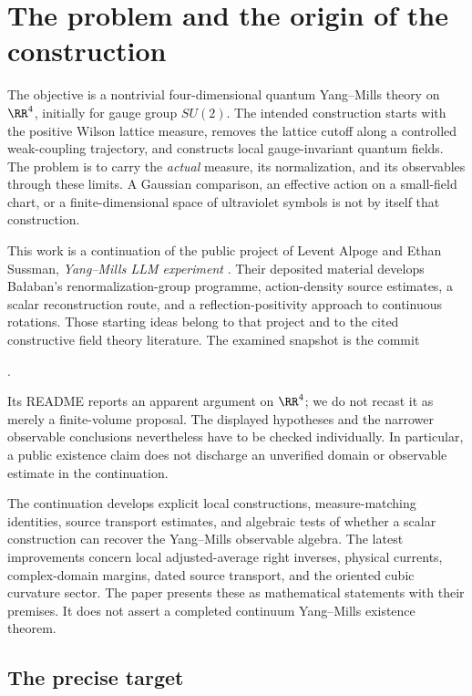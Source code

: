 \section{The problem and the origin of the construction}
\label{sec:introduction}

The objective is a nontrivial four-dimensional quantum Yang--Mills theory on
\(\RR^4\), initially for gauge group \(SU(2)\). The intended construction
starts with the positive Wilson lattice measure, removes the lattice cutoff
along a controlled weak-coupling trajectory, and constructs local
gauge-invariant quantum fields. The problem is to carry the \emph{actual}
measure, its normalization, and its observables through these limits. A
Gaussian comparison, an effective action on a small-field chart, or a
finite-dimensional space of ultraviolet symbols is not by itself that
construction.

This work is a continuation of the public project of Levent Alpoge and
Ethan Sussman, \emph{Yang--Mills LLM experiment} \cite{Upstream}. Their
deposited material develops Ba{\l}aban's renormalization-group programme,
action-density source estimates, a scalar reconstruction route, and a
reflection-positivity approach to continuous rotations. Those starting
ideas belong to that project and to the cited constructive field theory
literature. The examined snapshot is the commit
\begin{center}\small{}.\end{center}
Its README reports an apparent argument on \(\RR^4\); we do not recast it
as merely a finite-volume proposal. The displayed hypotheses and the
narrower observable conclusions nevertheless have to be checked
individually. In particular, a public existence claim does not discharge
an unverified domain or observable estimate in the continuation.

The continuation develops explicit local constructions, measure-matching
identities, source transport estimates, and algebraic tests of whether a
scalar construction can recover the Yang--Mills observable algebra. The
latest improvements concern local adjusted-average right inverses,
physical currents, complex-domain margins, dated source transport, and
the oriented cubic curvature sector. The paper presents these as
mathematical statements with their premises. It does not assert a
completed continuum Yang--Mills existence theorem.

\subsection{The precise target}

